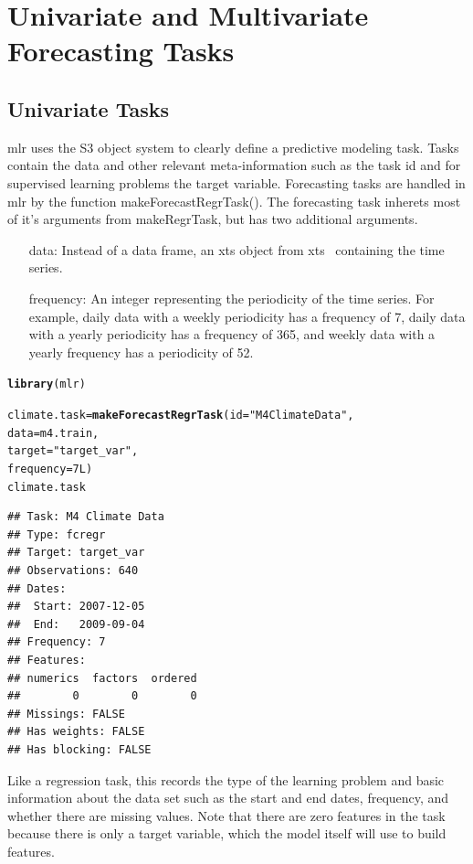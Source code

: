 \documentclass[12pt]{article}\usepackage[]{graphicx}\usepackage[]{color}
\makeatletter
\newcommand{\hlnum}[1]{\textcolor[rgb]{0.686,0.059,0.569}{#1}}%
\newcommand{\hlstr}[1]{\textcolor[rgb]{0.192,0.494,0.8}{#1}}%
\newcommand{\hlstd}[1]{\textcolor[rgb]{0.345,0.345,0.345}{#1}}%
\newcommand{\hlkwb}[1]{\textcolor[rgb]{0.69,0.353,0.396}{#1}}%
\newcommand{\hlkwc}[1]{\textcolor[rgb]{0.333,0.667,0.333}{#1}}%
\newcommand{\hlkwd}[1]{\textcolor[rgb]{0.737,0.353,0.396}{\textbf{#1}}}%
\newenvironment{kframe}{%
 \def\at@end@of@kframe{}%
 \ifinner\ifhmode%
  \def\at@end@of@kframe{\end{minipage}}%
  \begin{minipage}{\columnwidth}%
 \fi\fi%
 \def\FrameCommand##1{\hskip\@totalleftmargin \hskip-\fboxsep
 \colorbox{shadecolor}{##1}\hskip-\fboxsep
     \hskip-\linewidth \hskip-\@totalleftmargin \hskip\columnwidth}%
 \MakeFramed {\advance\hsize-\width
   \@totalleftmargin\z@ \linewidth\hsize
   \@setminipage}}%
 {\par\unskip\endMakeFramed%
 \at@end@of@kframe}
\newenvironment{knitrout}{}{} %
\theoremstyle{definition}
\newcommand\code{\@codex}
\def\@codex#1{{\normalfont\ttfamily\hyphenchar\font=-1 #1}}
\newcommand{\pkg}[1]{{\fontseries{b}\selectfont #1}}
\makeatother
\begin{document}
\section{Univariate and Multivariate Forecasting Tasks}
\label{sec:task}

\subsection{Univariate Tasks}
\label{sec:univarTask}
\pkg{mlr} uses the S3 object system to clearly define a predictive modeling task. Tasks contain the data and other relevant meta-information such as the task id and for supervised learning problems the target variable. Forecasting tasks are handled in \pkg{mlr} by the function \code{makeForecastRegrTask()}. The forecasting task inherets most of it's arguments from \code{makeRegrTask}, but has two additional arguments.

\begin{itemize}
\item[data:] Instead of a data frame, an xts object from \pkg{xts}~\cite{xts} containing the time series.
\item[frequency:] An integer representing the periodicity of the time series. For example, daily data with a weekly periodicity has a frequency of 7, daily data with a yearly periodicity has a frequency of 365, and weekly data with a yearly frequency has a periodicity of 52.
\end{itemize}

\singlespacing
\begin{knitrout}
\color{fgcolor}\begin{kframe}
\begin{alltt}
\hlkwd{library}\hlstd{(mlr)}

\hlstd{climate.task} \hlkwb{=} \hlkwd{makeForecastRegrTask}\hlstd{(}\hlkwc{id} \hlstd{=} \hlstr{"M4 Climate Data"}\hlstd{,}
                                 \hlkwc{data} \hlstd{= m4.train,}
                                 \hlkwc{target} \hlstd{=} \hlstr{"target_var"}\hlstd{,}
                                 \hlkwc{frequency} \hlstd{=} \hlnum{7L}\hlstd{)}
\hlstd{climate.task}
\end{alltt}
\begin{verbatim}
## Task: M4 Climate Data
## Type: fcregr
## Target: target_var
## Observations: 640
## Dates:
##  Start: 2007-12-05 
##  End:   2009-09-04
## Frequency: 7
## Features:
## numerics  factors  ordered 
##        0        0        0 
## Missings: FALSE
## Has weights: FALSE
## Has blocking: FALSE
\end{verbatim}
\end{kframe}
\end{knitrout}
\doublespacing
Like a regression task, this records the type of the learning problem and basic information about the data set such as the start and end dates, frequency, and whether there are missing values. Note that there are zero features in the task because there is only a target variable, which the model itself will use to build features.
\end{document}

